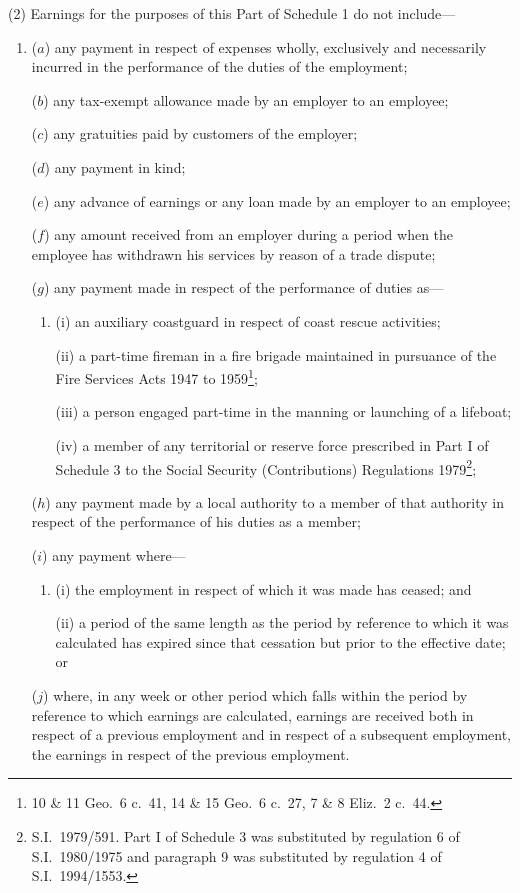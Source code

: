 \documentclass[12pt,a4paper]{article}
\begin{document}
(2) Earnings for the purposes of this Part of Schedule 1 do not include—
\begin{enumerate}\item[]
($a$) any payment in respect of expenses wholly, exclusively and necessarily incurred in the performance of the duties of the employment;

($b$) any tax-exempt allowance made by an employer to an employee;

($c$) any gratuities paid by customers of the employer;

($d$) any payment in kind;

($e$) any advance of earnings or any loan made by an employer to an employee;

($f$) any amount received from an employer during a period when the employee has withdrawn his services by reason of a trade dispute;

($g$) any payment made in respect of the performance of duties as—
\begin{enumerate}\item[]
(i) an auxiliary coastguard in respect of coast rescue activities;

(ii) a part-time fireman in a fire brigade maintained in pursuance of the Fire Services Acts 1947 to 1959\footnote{10 \& 11 Geo.\ 6 c.\ 41, 14 \& 15 Geo.\ 6 c.\ 27, 7 \& 8 Eliz.\ 2 c.\ 44.};

(iii) a person engaged part-time in the manning or launching of a lifeboat;

(iv) a member of any territorial or reserve force prescribed in Part I of Schedule 3 to the Social Security (Contributions) Regulations 1979\footnote{S.I.\ 1979/591. Part I of Schedule 3 was substituted by regulation 6 of S.I.\ 1980/1975 and paragraph 9 was substituted by regulation 4 of S.I.\ 1994/1553.};
\end{enumerate}

($h$) any payment made by a local authority to a member of that authority in respect of the performance of his duties as a member;

($i$) any payment where—
\begin{enumerate}\item[]
(i) the employment in respect of which it was made has ceased; and

(ii) a period of the same length as the period by reference to which it was calculated has expired since that cessation but prior to the effective date; or
\end{enumerate}

($j$) where, in any week or other period which falls within the period by reference to which earnings are calculated, earnings are received both in respect of a previous employment and in respect of a subsequent employment, the earnings in respect of the previous employment.
\end{enumerate}
\end{document}
